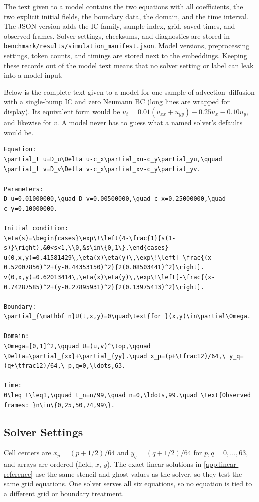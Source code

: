 The text given to a model contains the two equations with all coefficients, the two explicit initial fields, the boundary data, the domain, and the time interval. The JSON version adds the IC family, sample index, grid, saved times, and observed frames. Solver settings, checksums, and diagnostics are stored in \texttt{benchmark/results/simulation\_manifest.json}. Model versions, preprocessing settings, token counts, and timings are stored next to the embeddings. Keeping these records out of the model text means that no solver setting or label can leak into a model input.

Below is the complete text given to a model for one sample of advection--diffusion with a single-bump IC and zero Neumann BC (long lines are wrapped for display). Its equivalent form would be $u_t=0.01(u_{xx}+u_{yy})-0.25u_x-0.10u_y$, and likewise for $v$. A model never has to guess what a named solver's defaults would be.
\begin{lstlisting}[basicstyle=\ttfamily\scriptsize,breaklines=true,columns=fullflexible,frame=single]
Equation:
\partial_t u=D_u\Delta u-c_x\partial_xu-c_y\partial_yu,\qquad \partial_t v=D_v\Delta v-c_x\partial_xv-c_y\partial_yv.

Parameters:
D_u=0.01000000,\quad D_v=0.00500000,\quad c_x=0.25000000,\quad c_y=0.10000000.

Initial condition:
\eta(s)=\begin{cases}\exp\!\left(4-\frac{1}{s(1-s)}\right),&0<s<1,\\0,&s\in\{0,1\}.\end{cases}
u(0,x,y)=0.41581429\,\eta(x)\eta(y)\,\exp\!\left[-\frac{(x-0.52007856)^2+(y-0.44353150)^2}{2(0.08503441)^2}\right].
v(0,x,y)=0.62013414\,\eta(x)\eta(y)\,\exp\!\left[-\frac{(x-0.74287585)^2+(y-0.27895931)^2}{2(0.13975413)^2}\right].

Boundary:
\partial_{\mathbf n}U(t,x,y)=0\quad\text{for }(x,y)\in\partial\Omega.

Domain:
\Omega=[0,1]^2,\qquad U=(u,v)^\top,\qquad \Delta=\partial_{xx}+\partial_{yy}.\quad x_p=(p+\tfrac12)/64,\ y_q=(q+\tfrac12)/64,\ p,q=0,\ldots,63.

Time:
0\leq t\leq1,\qquad t_n=n/99,\quad n=0,\ldots,99.\quad \text{Observed frames: }n\in\{0,25,50,74,99\}.
\end{lstlisting}

\subsection{Solver Settings}
Cell centers are $x_p=(p+1/2)/64$ and $y_q=(q+1/2)/64$ for $p,q=0,\ldots,63$, and arrays are ordered (field, $x$, $y$). The exact linear solutions in \cref{app:linear-reference} use the same stencil and ghost values as the solver, so they test the same grid equations. One solver serves all six equations, so no equation is tied to a different grid or boundary treatment.

